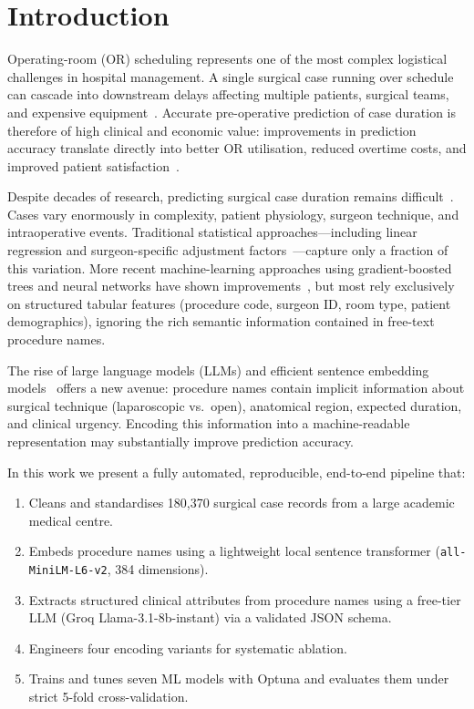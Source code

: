 \documentclass[11pt,twocolumn]{article}
\begin{document}
\section{Introduction}
\label{sec:intro}

Operating-room (OR) scheduling represents one of the most complex logistical
challenges in hospital management.  A single surgical case running over schedule
can cascade into downstream delays affecting multiple patients, surgical teams, and
expensive equipment~\cite{dexter2001}.  Accurate pre-operative prediction of case
duration is therefore of high clinical and economic value: improvements in
prediction accuracy translate directly into better OR utilisation, reduced overtime
costs, and improved patient satisfaction~\cite{strum2000}.

Despite decades of research, predicting surgical case duration remains
difficult~\cite{belien2006}.  Cases vary enormously in complexity, patient
physiology, surgeon technique, and intraoperative events.  Traditional statistical
approaches—including linear regression and surgeon-specific adjustment
factors~\cite{dexter2002}—capture only a fraction of this variation.
More recent machine-learning approaches using gradient-boosted trees and neural
networks have shown improvements~\cite{tuwatananurak2019, zhou2021}, but most
rely exclusively on structured tabular features (procedure code, surgeon ID,
room type, patient demographics), ignoring the rich semantic information contained
in free-text procedure names.

The rise of large language models (LLMs) and efficient sentence embedding
models~\cite{reimers2019} offers a new avenue: procedure names contain implicit
information about surgical technique (laparoscopic vs.\ open), anatomical region,
expected duration, and clinical urgency.  Encoding this information into a
machine-readable representation may substantially improve prediction accuracy.

In this work we present a fully automated, reproducible, end-to-end pipeline that:
\begin{enumerate}
  \item Cleans and standardises 180,370 surgical case records from a large
        academic medical centre.
  \item Embeds procedure names using a lightweight local sentence transformer
        (\texttt{all-MiniLM-L6-v2}, 384 dimensions).
  \item Extracts structured clinical attributes from procedure names using a
        free-tier LLM (Groq Llama-3.1-8b-instant) via a validated JSON schema.
  \item Engineers four encoding variants for systematic ablation.
  \item Trains and tunes seven ML models with Optuna and evaluates them under
        strict 5-fold cross-validation.
\end{enumerate}
\end{document}

